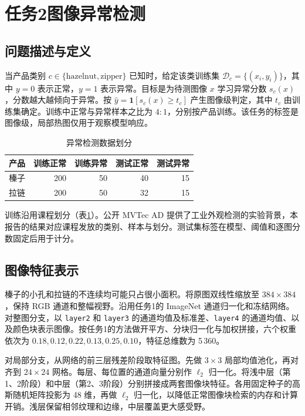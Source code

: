 \section{任务2\quad 图像异常检测}
\label{sec:task2}
\subsection{问题描述与定义}
当产品类别 $c\in\{\text{hazelnut},\text{zipper}\}$ 已知时，给定该类训练集 $\mathcal D_c=\{(x_i,y_i)\}$，其中 $y=0$ 表示正常，$y=1$ 表示异常。目标是为待测图像 $x$ 学习异常分数 $s_c(x)$，分数越大越倾向于异常。按 $\widehat y=\mathbf 1[s_c(x)\ge t_c]$ 产生图像级判定，其中 $t_c$ 由训练集确定。训练中正常与异常样本之比为 $4:1$，分别按产品训练。该任务的标签是图像级，局部热图仅用于观察模型响应。

\begin{table}[H]
 \caption{异常检测数据划分}
 \label{tab:anomaly-data}
 \centering
 \begin{tabular}{@{}lrrrr@{}}
 \toprule
 产品 & 训练正常 & 训练异常 & 测试正常 & 测试异常 \\
 \midrule
 榛子 & 200 & 50 & 40 & 15 \\
 拉链 & 200 & 50 & 32 & 15 \\
 \bottomrule
 \end{tabular}
\end{table}

训练沿用课程划分（表\ref{tab:anomaly-data}）。公开 MVTec AD 提供了工业外观检测的实验背景\cite{bergmann2019}，本报告的结果对应课程发放的类别、样本与划分。测试集标签在模型、阈值和逐图分数固定后用于计分。

\subsection{图像特征表示}
榛子的小孔和拉链的不连续均可能只占很小面积。将原图双线性缩放至 $384\times384$，保持 RGB 通道和整幅视野。沿用任务1的 ImageNet 通道归一化和冻结网络。对整图分支，以 \texttt{layer2} 和 \texttt{layer3} 的通道均值及标准差、\texttt{layer4} 的通道均值、以及颜色块表示图像。按任务1的方法做开平方、分块归一化与加权拼接，六个权重依次为 $0.18,\allowbreak 0.12,\allowbreak 0.22,\allowbreak 0.13,\allowbreak 0.25,\allowbreak 0.10$，特征总维数为 5\,360。

对局部分支，从网络的前三层残差阶段取特征图。先做 $3\times3$ 局部均值池化，再对齐到 $24\times24$ 网格。每层、每位置的通道向量分别作 $\ell_2$ 归一化。将浅中层（第1、2阶段）和中层（第2、3阶段）分别拼接成两套图像块特征。各用固定种子的高斯随机矩阵投影为 48 维，再做 $\ell_2$ 归一化，以降低正常图像块检索的内存和计算开销。浅层保留相邻纹理和边缘，中层覆盖更大感受野。

